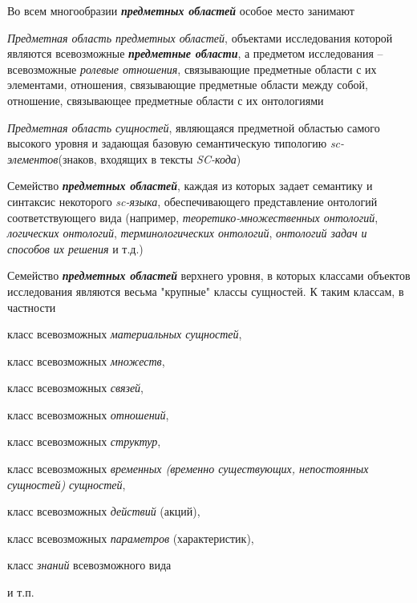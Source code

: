 \begin{SCn}
{Во всем многообразии \textbf{\textit{предметных областей}} особое место занимают
\begin{scnitemize}
    \item \textit{Предметная область предметных областей}, объектами исследования которой являются всевозможные \textbf{\textit{предметные области}}, а предметом исследования -- всевозможные \textit{ролевые отношения}, связывающие предметные области с их элементами, отношения, связывающие предметные области между собой, отношение, связывающее предметные области с их онтологиями
    \item \textit{Предметная область сущностей}, являющаяся предметной областью самого высокого уровня и задающая базовую семантическую типологию \textit{sc-элементов}(знаков, входящих в тексты \textit{SC-кода})
    \item Семейство \textbf{\textit{предметных областей}}, каждая из которых задает семантику и синтаксис некоторого \textit{sc-языка}, обеспечивающего представление онтологий соответствующего вида (например, \textit{теоретико-множественных онтологий}, \textit{логических онтологий}, \textit{терминологических онтологий}, \textit{онтологий задач и способов их решения} и т.д.)
    \item Семейство \textbf{\textit{предметных областей}} верхнего уровня, в которых классами объектов исследования являются весьма "крупные"{} классы сущностей. К таким классам, в частности
    
    \begin{scnitemizeii}
        \item класс всевозможных \textit{материальных сущностей},
        \item класс всевозможных \textit{множеств},
        \item класс всевозможных \textit{связей},
        \item класс всевозможных \textit{отношений},
        \item класс всевозможных \textit{структур},
        \item класс всевозможных \textit{временных (временно существующих, непостоянных сущностей) сущностей},
        \item класс всевозможных \textit{действий} (акций),
        \item класс всевозможных \textit{параметров} (характеристик),
        \item класс \textit{знаний} всевозможного вида 
        \item и т.п.
    \end{scnitemizeii}
\end{scnitemize}


}
\end{SCn}
